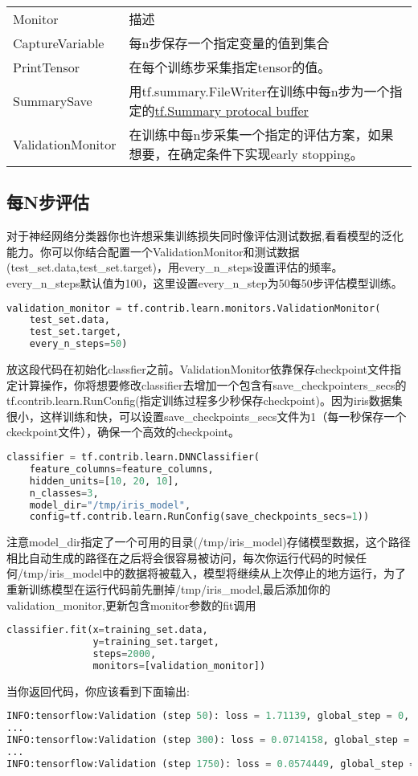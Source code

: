 \begin{table}[h!]
\centering
	\begin{tabular}{|p{3cm}|p{7cm}|}
\hline 
Monitor&描述\\
CaptureVariable&每n步保存一个指定变量的值到集合\\
PrintTensor&在每个训练步采集指定tensor的值。\\
SummarySave&用tf.summary.FileWriter在训练中每n步为一个指定的\href{https://www.tensorflow.org/api_docs/python/tf/Summary}{tf.Summary protocal buffer}\\
ValidationMonitor&在训练中每n步采集一个指定的评估方案，如果想要，在确定条件下实现early stopping。\\
\hline
\end{tabular}
\end{table}
\subsection{每N步评估}
对于神经网络分类器你也许想采集训练损失同时像评估测试数据,看看模型的泛化能力。你可以你结合配置一个ValidationMonitor和测试数据(test\_set.data,test\_set.target)，用every\_n\_steps设置评估的频率。every\_n\_steps默认值为100，这里设置every\_n\_step为50每50步评估模型训练。
\begin{lstlisting}[language=Python]
validation_monitor = tf.contrib.learn.monitors.ValidationMonitor(
    test_set.data,
    test_set.target,
    every_n_steps=50)
\end{lstlisting}
放这段代码在初始化classfier之前。ValidationMonitor依靠保存checkpoint文件指定计算操作，你将想要修改classifier去增加一个包含有save\_checkpointers\_secs的tf.contrib.learn.RunConfig(指定训练过程多少秒保存checkpoint)。因为iris数据集很小，这样训练和快，可以设置save\_checkpoints\_secs文件为1（每一秒保存一个ckeckpoint文件），确保一个高效的checkpoint。
\begin{lstlisting}[language=Python]
classifier = tf.contrib.learn.DNNClassifier(
    feature_columns=feature_columns,
    hidden_units=[10, 20, 10],
    n_classes=3,
    model_dir="/tmp/iris_model",
    config=tf.contrib.learn.RunConfig(save_checkpoints_secs=1))
\end{lstlisting}
注意model\_dir指定了一个可用的目录(/tmp/iris\_model)存储模型数据，这个路径相比自动生成的路径在之后将会很容易被访问，每次你运行代码的时候任何/tmp/iris\_model中的数据将被载入，模型将继续从上次停止的地方运行，为了重新训练模型在运行代码前先删掉/tmp/iris\_model,最后添加你的validation\_monitor,更新包含monitor参数的fit调用
\begin{lstlisting}[language=Python]
classifier.fit(x=training_set.data,
               y=training_set.target,
               steps=2000,
               monitors=[validation_monitor])
\end{lstlisting}
当你返回代码，你应该看到下面输出:
\begin{lstlisting}[language=Python]
INFO:tensorflow:Validation (step 50): loss = 1.71139, global_step = 0, accuracy = 0.266667
...
INFO:tensorflow:Validation (step 300): loss = 0.0714158, global_step = 268, accuracy = 0.966667
...
INFO:tensorflow:Validation (step 1750): loss = 0.0574449, global_step = 1729, accuracy = 0.966667
\end{lstlisting}
